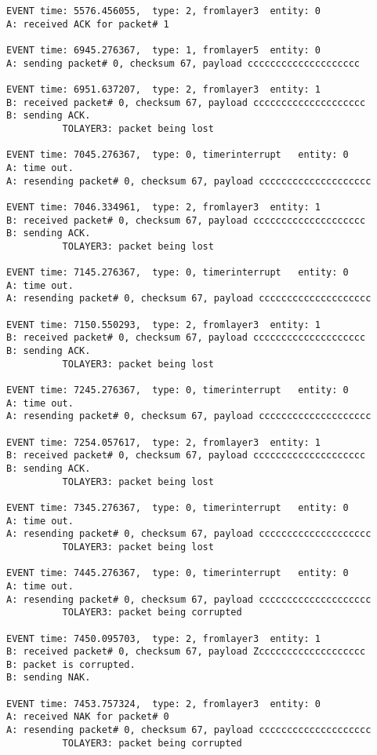 \documentclass[12pt]{article}
\begin{document}
\begin{verbatim}
EVENT time: 5576.456055,  type: 2, fromlayer3  entity: 0
A: received ACK for packet# 1

EVENT time: 6945.276367,  type: 1, fromlayer5  entity: 0
A: sending packet# 0, checksum 67, payload cccccccccccccccccccc

EVENT time: 6951.637207,  type: 2, fromlayer3  entity: 1
B: received packet# 0, checksum 67, payload cccccccccccccccccccc
B: sending ACK.
          TOLAYER3: packet being lost

EVENT time: 7045.276367,  type: 0, timerinterrupt   entity: 0
A: time out. 
A: resending packet# 0, checksum 67, payload cccccccccccccccccccc

EVENT time: 7046.334961,  type: 2, fromlayer3  entity: 1
B: received packet# 0, checksum 67, payload cccccccccccccccccccc
B: sending ACK.
          TOLAYER3: packet being lost

EVENT time: 7145.276367,  type: 0, timerinterrupt   entity: 0
A: time out. 
A: resending packet# 0, checksum 67, payload cccccccccccccccccccc

EVENT time: 7150.550293,  type: 2, fromlayer3  entity: 1
B: received packet# 0, checksum 67, payload cccccccccccccccccccc
B: sending ACK.
          TOLAYER3: packet being lost

EVENT time: 7245.276367,  type: 0, timerinterrupt   entity: 0
A: time out. 
A: resending packet# 0, checksum 67, payload cccccccccccccccccccc

EVENT time: 7254.057617,  type: 2, fromlayer3  entity: 1
B: received packet# 0, checksum 67, payload cccccccccccccccccccc
B: sending ACK.
          TOLAYER3: packet being lost

EVENT time: 7345.276367,  type: 0, timerinterrupt   entity: 0
A: time out. 
A: resending packet# 0, checksum 67, payload cccccccccccccccccccc
          TOLAYER3: packet being lost

EVENT time: 7445.276367,  type: 0, timerinterrupt   entity: 0
A: time out. 
A: resending packet# 0, checksum 67, payload cccccccccccccccccccc
          TOLAYER3: packet being corrupted

EVENT time: 7450.095703,  type: 2, fromlayer3  entity: 1
B: received packet# 0, checksum 67, payload Zccccccccccccccccccc
B: packet is corrupted.
B: sending NAK.

EVENT time: 7453.757324,  type: 2, fromlayer3  entity: 0
A: received NAK for packet# 0
A: resending packet# 0, checksum 67, payload cccccccccccccccccccc
          TOLAYER3: packet being corrupted


\end{verbatim}
\end{document}
